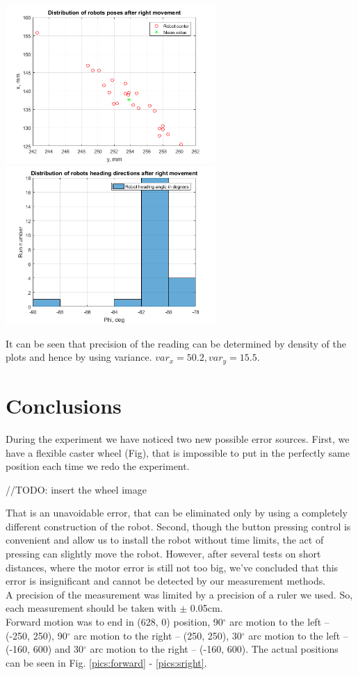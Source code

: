 \documentclass[a4paper, 12pt]{article}
\begin{document}
\begin{center}
  \includegraphics[width=0.6\textwidth]{RR}
  \includegraphics[width=0.6\textwidth]{RRphi}
\end{center}

It can be seen that precision of the reading can be determined by density of the plots and hence by using variance. $var_x = 50.2,var_y = 15.5$.

\newpage

\section{Conclusions}
During the experiment we have noticed two new possible error sources. First, we have a flexible caster wheel (Fig), that is impossible to put in the perfectly same position each time we redo the experiment.

//TODO: insert the wheel image

That is an unavoidable error, that can be eliminated only by using a completely different construction of the robot. Second, though the button pressing control is convenient and allow us to install the robot without time limits, the act of pressing can slightly move the robot. However, after several tests on short distances, where the motor error is still not too big, we've concluded that this error is insignificant and cannot be detected by our measurement methods. \\

A precision of the measurement was limited by a precision of a ruler we used. So, each measurement should be taken with $\pm$ 0.05cm.\\
Forward motion was to end in (628, 0) position, 90$^{\circ}$ arc motion to the left -- (-250, 250), 90$^{\circ}$ arc motion to the right -- (250, 250), 30$^{\circ}$ arc motion to the left -- (-160, 600) and 30$^{\circ}$ arc motion to the right -- (-160, 600). The actual positions can be seen in Fig. \ref{pics:forward} - \ref{pics:sright}.
\end{document}
